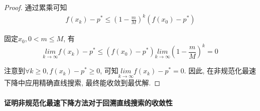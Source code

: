 \documentclass[UTF8]{ctexart}
\theoremstyle{Defination}
\theoremstyle{remark}
\begin{document}
\begin{proof}
通过累乘可知
\begin{equation}
\begin{aligned}
f(x_{k})-p^* \leq(1-\frac{m}{M})^k(f(x_0)-p^*)
\end{aligned}
\end{equation}

固定$x_0,0<m\leq M$, 
有$$\underset{k\to\infty}{lim}f(x_{k})-p^*\leq(f(x_0)-p^*)\underset{k\to\infty}{lim}(1-\frac{m}{M})^k=0$$

注意到$\forall k\geq0, f(x_{k})-p^*\geq0$, 可知$\underset{k\to\infty}{lim}f(x_{k})-p^*=0$. 
因此, 在非规范化最速下降中应用精确直线搜索, 最终能收敛到最优解. 

\end{proof}

\paragraph{证明非规范化最速下降方法对于回溯直线搜索的收敛性}
\end{document}
